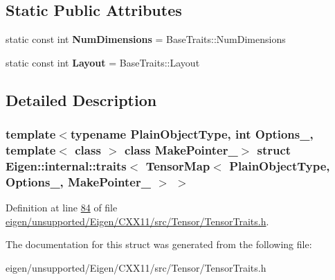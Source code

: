 \subsection*{Static Public Attributes}
\begin{DoxyCompactItemize}
\item 
\mbox{\label{struct_eigen_1_1internal_1_1traits_3_01_tensor_map_3_01_plain_object_type_00_01_options___00_01_make_pointer___01_4_01_4_a147151a4987386df66687136d3bfb67e}} 
static const int {\bfseries Num\+Dimensions} = Base\+Traits\+::\+Num\+Dimensions
\item 
\mbox{\label{struct_eigen_1_1internal_1_1traits_3_01_tensor_map_3_01_plain_object_type_00_01_options___00_01_make_pointer___01_4_01_4_ae273e51d03e6f74099918113933489b7}} 
static const int {\bfseries Layout} = Base\+Traits\+::\+Layout
\end{DoxyCompactItemize}


\subsection{Detailed Description}
\subsubsection*{template$<$typename Plain\+Object\+Type, int Options\+\_\+, template$<$ class $>$ class Make\+Pointer\+\_\+$>$\newline
struct Eigen\+::internal\+::traits$<$ Tensor\+Map$<$ Plain\+Object\+Type, Options\+\_\+, Make\+Pointer\+\_\+ $>$ $>$}



Definition at line \hyperlink{eigen_2unsupported_2_eigen_2_c_x_x11_2src_2_tensor_2_tensor_traits_8h_source_l00084}{84} of file \hyperlink{eigen_2unsupported_2_eigen_2_c_x_x11_2src_2_tensor_2_tensor_traits_8h_source}{eigen/unsupported/\+Eigen/\+C\+X\+X11/src/\+Tensor/\+Tensor\+Traits.\+h}.



The documentation for this struct was generated from the following file\+:\begin{DoxyCompactItemize}
\item 
eigen/unsupported/\+Eigen/\+C\+X\+X11/src/\+Tensor/\+Tensor\+Traits.\+h\end{DoxyCompactItemize}
